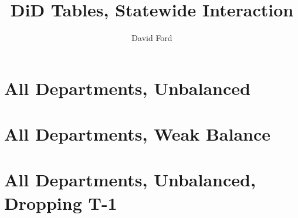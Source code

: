 \documentclass[12pt,a4paper]{article}
\begin{document}

\title{DiD Tables, Statewide Interaction}
\author{David Ford}
\maketitle


\pagebreak

\section{All Departments, Unbalanced}

\begin{center}

\end{center}

\begin{center}

\end{center}

\pagebreak

\section{All Departments, Weak Balance}

\begin{center}

\end{center}

\begin{center}

\end{center}

\pagebreak

\section{All Departments, Unbalanced, Dropping T-1}

\begin{center}

\end{center}
\end{document}
